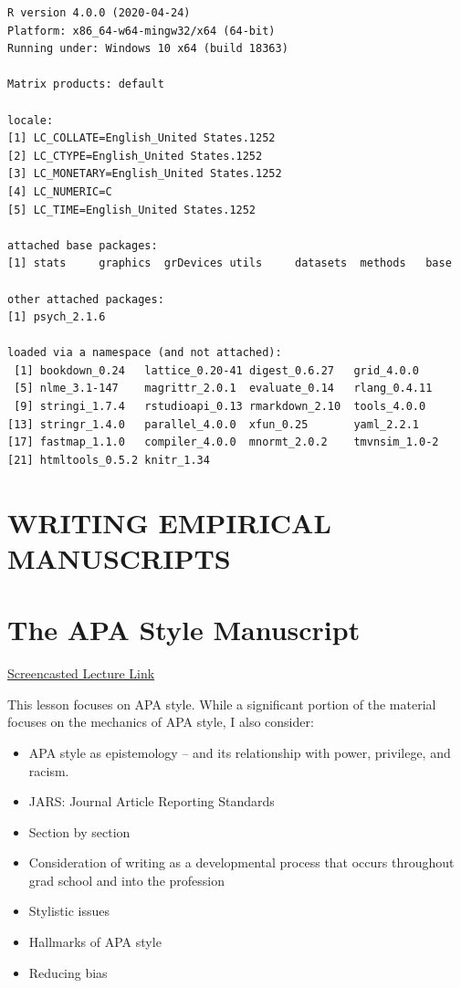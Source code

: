 \documentclass[
  english,
]{book}
\providecommand{\tightlist}{%
  \setlength{\itemsep}{0pt}\setlength{\parskip}{0pt}}
\begin{document}
\begin{verbatim}
R version 4.0.0 (2020-04-24)
Platform: x86_64-w64-mingw32/x64 (64-bit)
Running under: Windows 10 x64 (build 18363)

Matrix products: default

locale:
[1] LC_COLLATE=English_United States.1252 
[2] LC_CTYPE=English_United States.1252   
[3] LC_MONETARY=English_United States.1252
[4] LC_NUMERIC=C                          
[5] LC_TIME=English_United States.1252    

attached base packages:
[1] stats     graphics  grDevices utils     datasets  methods   base     

other attached packages:
[1] psych_2.1.6

loaded via a namespace (and not attached):
 [1] bookdown_0.24   lattice_0.20-41 digest_0.6.27   grid_4.0.0     
 [5] nlme_3.1-147    magrittr_2.0.1  evaluate_0.14   rlang_0.4.11   
 [9] stringi_1.7.4   rstudioapi_0.13 rmarkdown_2.10  tools_4.0.0    
[13] stringr_1.4.0   parallel_4.0.0  xfun_0.25       yaml_2.2.1     
[17] fastmap_1.1.0   compiler_4.0.0  mnormt_2.0.2    tmvnsim_1.0-2  
[21] htmltools_0.5.2 knitr_1.34     
\end{verbatim}

\hypertarget{writing-empirical-manuscripts}{%
\chapter*{WRITING EMPIRICAL MANUSCRIPTS}\label{writing-empirical-manuscripts}}

\hypertarget{APAstyle}{%
\chapter{The APA Style Manuscript}\label{APAstyle}}

\href{https://spu.hosted.panopto.com/Panopto/Pages/Viewer.aspx?pid=8ca9d96d-0ff6-4068-a570-ac290189a4d4}{Screencasted Lecture Link}

This lesson focuses on APA style. While a significant portion of the material focuses on the mechanics of APA style, I also consider:

\begin{itemize}
\tightlist
\item
  APA style as epistemology -- and its relationship with power, privilege, and racism.
\item
  JARS: Journal Article Reporting Standards
\item
  Section by section
\item
  Consideration of writing as a developmental process that occurs throughout grad school and into the profession
\item
  Stylistic issues
\item
  Hallmarks of APA style
\item
  Reducing bias
\end{itemize}
\end{document}
